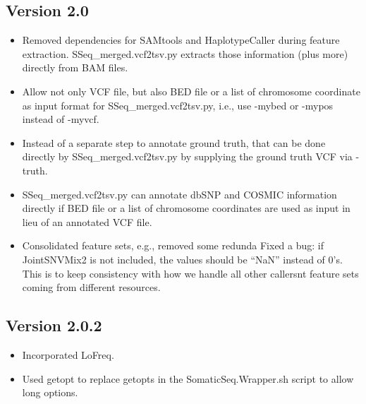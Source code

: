 \documentclass[10pt,letterpaper]{article}
\begin{document}
\begin{sloppypar}
\begin{itemize}
 
\end{itemize}




\subsection{Version 2.0}

\begin{itemize}
  \item
  Removed dependencies for SAMtools and HaplotypeCaller during feature extraction. SSeq\_merged.vcf2tsv.py extracts those information (plus more) directly from BAM files.

  \item
  Allow not only VCF file, but also BED file or a list of chromosome coordinate as input format for SSeq\_merged.vcf2tsv.py, i.e., use -mybed or -mypos instead of -myvcf. 

  \item
  Instead of a separate step to annotate ground truth, that can be done directly by SSeq\_merged.vcf2tsv.py by supplying the ground truth VCF via -truth.

  \item
  SSeq\_merged.vcf2tsv.py can annotate dbSNP and COSMIC information directly if BED file or a list of chromosome coordinates are used as input in lieu of an annotated VCF file. 

  \item
  Consolidated feature sets, e.g., removed some redunda
  Fixed a bug: if JointSNVMix2 is not included, the values should be ``NaN'' instead of 0's. This is to keep consistency with how we handle all other callersnt feature sets coming from different resources.
\end{itemize}


\subsection{Version 2.0.2}

\begin{itemize}

  \item
  Incorporated LoFreq.
  
  \item
  Used getopt to replace getopts in the SomaticSeq.Wrapper.sh script to allow long options. 
  
\end{itemize}




\end{sloppypar}
\end{document}
